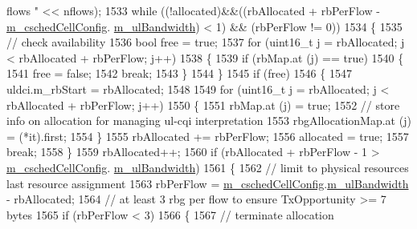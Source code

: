 \begin{DoxyCode}
{       flows "} << nflows);
1533       \textcolor{keywordflow}{while} ((!allocated)&&((rbAllocated + rbPerFlow - \hyperlink{classns3_1_1TdBetFfMacScheduler_a3e53aae0259501332769cd6ca4b74800}{m\_cschedCellConfig}.
      \hyperlink{structns3_1_1FfMacCschedSapProvider_1_1CschedCellConfigReqParameters_a5ab5b102878e6e7e7727a14af4a64d2f}{m\_ulBandwidth}) < 1) && (rbPerFlow != 0))
1534         \{
1535           \textcolor{comment}{// check availability}
1536           \textcolor{keywordtype}{bool} free = \textcolor{keyword}{true};
1537           \textcolor{keywordflow}{for} (uint16\_t j = rbAllocated; j < rbAllocated + rbPerFlow; j++)
1538             \{
1539               \textcolor{keywordflow}{if} (rbMap.at (j) == \textcolor{keyword}{true})
1540                 \{
1541                   free = \textcolor{keyword}{false};
1542                   \textcolor{keywordflow}{break};
1543                 \}
1544             \}
1545           \textcolor{keywordflow}{if} (free)
1546             \{
1547               uldci.m\_rbStart = rbAllocated;
1548 
1549               \textcolor{keywordflow}{for} (uint16\_t j = rbAllocated; j < rbAllocated + rbPerFlow; j++)
1550                 \{
1551                   rbMap.at (j) = \textcolor{keyword}{true};
1552                   \textcolor{comment}{// store info on allocation for managing ul-cqi interpretation}
1553                   rbgAllocationMap.at (j) = (*it).first;
1554                 \}
1555               rbAllocated += rbPerFlow;
1556               allocated = \textcolor{keyword}{true};
1557               \textcolor{keywordflow}{break};
1558             \}
1559           rbAllocated++;
1560           \textcolor{keywordflow}{if} (rbAllocated + rbPerFlow - 1 > \hyperlink{classns3_1_1TdBetFfMacScheduler_a3e53aae0259501332769cd6ca4b74800}{m\_cschedCellConfig}.
      \hyperlink{structns3_1_1FfMacCschedSapProvider_1_1CschedCellConfigReqParameters_a5ab5b102878e6e7e7727a14af4a64d2f}{m\_ulBandwidth})
1561             \{
1562               \textcolor{comment}{// limit to physical resources last resource assignment}
1563               rbPerFlow = \hyperlink{classns3_1_1TdBetFfMacScheduler_a3e53aae0259501332769cd6ca4b74800}{m\_cschedCellConfig}.\hyperlink{structns3_1_1FfMacCschedSapProvider_1_1CschedCellConfigReqParameters_a5ab5b102878e6e7e7727a14af4a64d2f}{m\_ulBandwidth} - rbAllocated;
1564               \textcolor{comment}{// at least 3 rbg per flow to ensure TxOpportunity >= 7 bytes}
1565               \textcolor{keywordflow}{if} (rbPerFlow < 3)
1566                 \{
1567                   \textcolor{comment}{// terminate allocation}

\end{DoxyCode}
